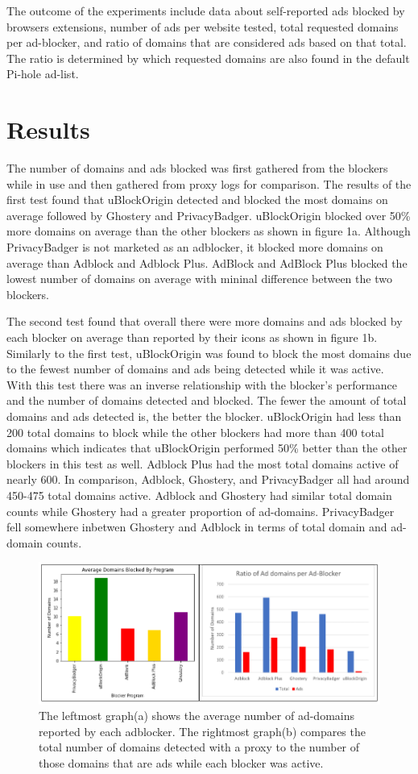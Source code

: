 \documentclass[sigsmall]{acmart}
\begin{document}
The outcome of the experiments include data about self-reported ads blocked by browsers extensions, number of ads per website tested, total requested domains per ad-blocker, and ratio of domains that are considered ads based on that total. The ratio is determined by which requested domains are also found in the default Pi-hole ad-list.
\section*{Results}
The number of domains and ads blocked was first gathered from the blockers while in use and then gathered from proxy logs for comparison. The results of the first test found that uBlockOrigin detected and blocked the most domains on average followed by Ghostery and PrivacyBadger. uBlockOrigin blocked over 50\% more domains on average than the other blockers as shown in figure 1a. Although PrivacyBadger is not marketed as an adblocker, it blocked more domains on average than Adblock and Adblock Plus. 
AdBlock and AdBlock Plus blocked the lowest number of domains on average with mininal difference between the two blockers.  
 
The second test found that overall there were more domains and ads blocked by each blocker on average than reported by their icons as shown in figure 1b. Similarly to the first test, uBlockOrigin was found to block the most domains due to the fewest number of domains and ads being detected while it was active. With this test there was an inverse relationship with the blocker's performance and the number of domains detected and blocked. The fewer the amount of total domains and ads detected is, the better the blocker. uBlockOrigin had less than 200 total domains to block while the other blockers had more than 400 total domains which indicates that uBlockOrigin performed 50\% better than the other blockers in this test as well. Adblock Plus had the most total domains active of nearly 600. In comparison, Adblock, Ghostery, and PrivacyBadger all had around 450-475 total domains active. Adblock and Ghostery had similar total domain counts while Ghostery had a greater proportion of ad-domains. PrivacyBadger fell somewhere inbetwen Ghostery and Adblock in terms of total domain and ad-domain counts.   
\begin{figure}[H]
  \includegraphics[scale = 0.75]{Edit3.png}
  \caption{ The leftmost graph(a) shows the average number of ad-domains reported by each adblocker. The rightmost graph(b) compares the total number of domains detected with a proxy to the number of those domains that are ads while each blocker was active.}
  \label{fig:graph1ab}
\end{figure}
\end{document}
